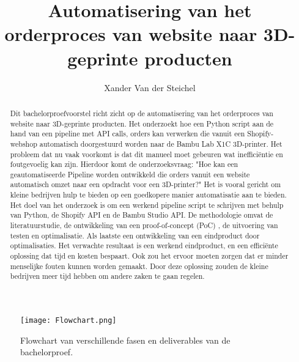 \documentclass{hogent-article}
\title{Automatisering van het orderproces van website naar 3D-geprinte producten}
\author{Xander Van der Steichel}
\begin{document}
\begin{abstract}
    Dit bachelorproefvoorstel richt zicht op de automatisering van het orderproces van website naar 3D-geprinte producten. Het onderzoekt hoe een Python script aan de hand van een pipeline met API calls, orders kan verwerken die vanuit een Shopify-webshop automatisch doorgestuurd worden naar de Bambu Lab X1C 3D-printer. Het probleem dat nu vaak voorkomt is dat dit manueel moet gebeuren wat inefficiëntie en foutgevoelig kan zijn. Hierdoor komt de onderzoeksvraag: "Hoe kan een geautomatiseerde Pipeline worden ontwikkeld die orders vanuit een website automatisch omzet naar een opdracht voor een 3D-printer?" Het is vooral gericht om kleine bedrijven hulp te bieden op een goedkopere manier automatisatie aan te bieden. Het doel van het onderzoek is om een werkend pipeline script te schrijven met behulp van Python, de Shopify API en de Bambu Studio API. De methodologie omvat de literatuurstudie, de ontwikkeling van een proof-of-concept (PoC) , de uitvoering van testen en optimalisatie. Als laatste een ontwikkeling van een eindproduct door optimalisaties. Het verwachte resultaat is een werkend eindproduct, en een efficiënte oplossing dat tijd en kosten bespaart. Ook zou het ervoor moeten zorgen dat er minder menselijke fouten kunnen worden gemaakt. Door deze oplossing zouden de kleine bedrijven meer tijd hebben om andere zaken te gaan regelen.
 
\end{abstract}




\tableofcontents



\printbibliography[heading=bibintoc]


\begin{figure}[H]  %
    \centering
    \texttt{[image: Flowchart.png]}  %
    \caption{Flowchart van verschillende fasen en deliverables van de bachelorproef.}
    \label{fig:flowchart}  %
\end{figure}
\end{document}
